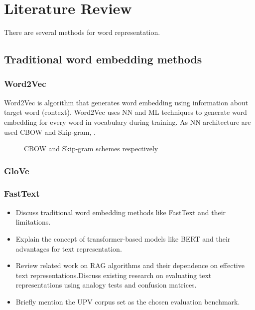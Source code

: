 
\chapter{Literature Review\label{chap:literature_review}}

There are several methods for word representation.

\section{Traditional word embedding methods}

\subsection{Word2Vec \cite{word2vec}}  
Word2Vec is algorithm that generates word embedding using information about target word (context).
Word2Vec uses \ac{NN} and \ac{ML} techniques to generate word embedding for every word in vocabulary during training.
As \ac{NN} architecture are used \ac{CBOW} and Skip-gram, .

\begin{figure}[h]
    \centering
    
    
    \caption{\ac{CBOW} and Skip-gram schemes respectively}
    \label{fig:cbow_skipgram_scheme}
\end{figure} 
  

\subsection{GloVe \cite{glove}}
\subsection{FastText \cite{fasttext}}





\begin{itemize}
    \item Discuss traditional word embedding methods like FastText and their limitations.
    \item Explain the concept of transformer-based models like BERT and their advantages for text representation.
    \item Review related work on RAG algorithms and their dependence on effective text representations.Discuss existing research on evaluating text representations using analogy tests and confusion matrices.
    \item Briefly mention the UPV corpus set as the chosen evaluation benchmark.
\end{itemize}